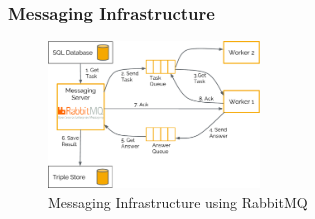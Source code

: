 \subsubsection{Messaging Infrastructure}
\label{subsubsec_messaging_infrastructure}

\begin{figure}[ht]
  \begin{center}
  \includegraphics[width=0.5\textwidth]{images/rabbit_mq.pdf}
  \end{center}
  \caption{Messaging Infrastructure using RabbitMQ}
  \label{fig_messaging_infrastructure}
\end{figure}